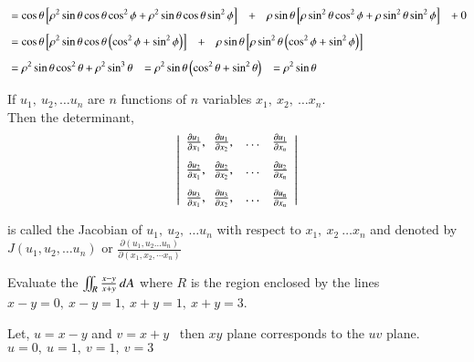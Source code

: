 \documentclass[11pt]{extarticle}
\newcommand{\miint}{\iint\displaylimits}
\begin{document}
\vspace{1ex}
$\begin{aligned}
   & = \cos\theta \left[\rho^2\sin\theta\cos\theta\cos^2\phi + \rho^2\sin\theta\cos\theta\sin^2\phi\right] \ \ \  + \ \ \  \rho\sin\theta \left[\rho\sin^2\theta\cos^2\phi+\rho\sin^2\theta\sin^2\phi\right] \ \ \  + 0 \\[1ex]
   & = \cos\theta \left[\rho^2\sin\theta\cos\theta
   \left(\cos^2\phi + \sin^2\phi\right)
   \right] \ \ \  + \ \ \  \rho\sin\theta \left[\rho\sin^2\theta
   \left(\cos^2\phi + \sin^2\phi\right)
   \right]\\[1ex]
   & = \rho^2\sin\theta\cos^2\theta + \rho^2\sin^3\theta
   \ \ \  = \rho^2\sin\theta \left(\cos^2\theta + \sin^2\theta\right)
   \ \ \  = \rho^2\sin\theta
\end{aligned}$

\pagebreak
{}
If $u_1,\ u_2,\ldots u_n$ are $n$ functions of $n$ variables $x_1,\ x_2,\ \ldots x_n$.\\
Then the determinant,
$$
\left|\begin{array}{llll}
\frac{\partial u_1}{\partial x_1}, \hspace{0.5em}
\frac{\partial u_1}{\partial x_2}, & \ldots &
\frac{\partial u_1}{\partial x_n}\\[2ex]
\frac{\partial u_2}{\partial x_1}, \hspace{0.5em}
\frac{\partial u_2}{\partial x_2}, & \ldots &
\frac{\partial u_2}{\partial x_n}\\[2ex]
\frac{\partial u_3}{\partial x_1}, \hspace{0.5em}
\frac{\partial u_3}{\partial x_2}, & \ldots &
\frac{\partial u_n}{\partial x_n}
\end{array}\right|
$$

is called the Jacobian of $u_1,\ u_2,\ \ldots u_n$ with respect to $x_1,\ x_2\ \ldots x_n$ and denoted by $J\left(u_1, u_2, \ldots u_n\right)$ or
$\frac{\partial\left(u_1, u_2 \ldots u_n\right)}{\partial\left(x_1, x_2, \cdots x_n\right)}$

\vspace{4ex}
\textbf{} Evaluate the $\miint_R \frac{x-y}{x+y} \,dA$ where $R$ is the region enclosed by the lines \ $x-y=0, \ x-y=1, \ x+y=1, \ x+y=3$.

Let, $u=x-y$ and $v=x+y$ \ then $x y$ plane corresponds to the $uv$ plane. $u=0, \ u=1, \ v=1, \ v=3$
\end{document}
